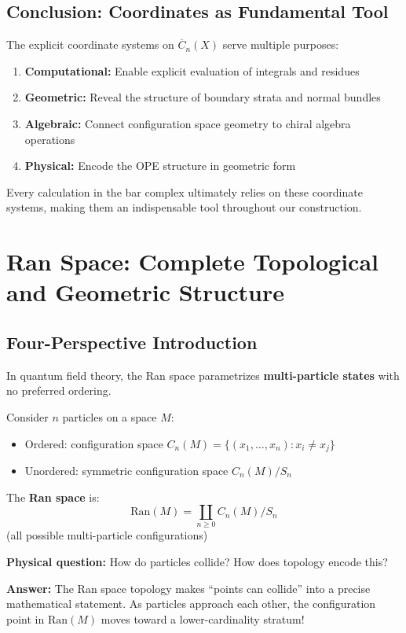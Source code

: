 \subsection{Conclusion: Coordinates as Fundamental Tool}

\begin{conclusion}
The explicit coordinate systems on $\overline{C}_n(X)$ serve multiple purposes:

\begin{enumerate}
\item \textbf{Computational:} Enable explicit evaluation of integrals and residues
\item \textbf{Geometric:} Reveal the structure of boundary strata and normal bundles  
\item \textbf{Algebraic:} Connect configuration space geometry to chiral algebra operations
\item \textbf{Physical:} Encode the OPE structure in geometric form
\end{enumerate}

Every calculation in the bar complex ultimately relies on these coordinate systems,
making them an indispensable tool throughout our construction.
\end{conclusion}


\section{Ran Space: Complete Topological and Geometric Structure}
\label{sec:ran-space-complete}

\subsection{Four-Perspective Introduction}

\begin{motivation}
In quantum field theory, the Ran space parametrizes \textbf{multi-particle states} 
with no preferred ordering.

Consider $n$ particles on a space $M$:
\begin{itemize}
\item Ordered: configuration space $C_n(M) = \{(x_1, \ldots, x_n) : x_i \neq x_j\}$
\item Unordered: symmetric configuration space $C_n(M)/S_n$
\end{itemize}

The \textbf{Ran space} is:
$$\text{Ran}(M) = \coprod_{n \geq 0} C_n(M)/S_n$$
(all possible multi-particle configurations)

\textbf{Physical question:} How do particles collide? How does topology encode this?

\textbf{Answer:} The Ran space topology makes ``points can collide'' into a precise 
mathematical statement. As particles approach each other, the configuration point 
in $\text{Ran}(M)$ moves toward a lower-cardinality stratum!
\end{motivation}

